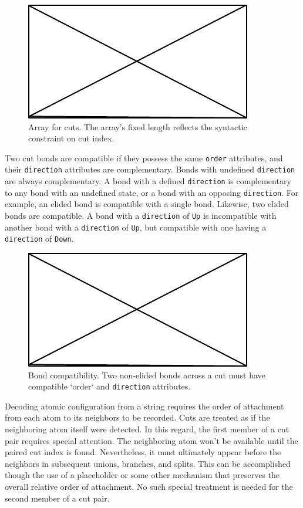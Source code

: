\documentclass{article}
\def\ttt{\texttt}
\begin{document}
\begin{figure}
    \centering
    \includegraphics{filler}
    \caption{Array for cuts. The array's fixed length reflects the syntactic constraint on cut index.}
    \label{fig:cuts-array}
\end{figure}

Two cut bonds are compatible if they possess the same \ttt{order} attributes, and their \ttt{direction} attributes are complementary. Bonds with undefined \ttt{direction} are always complementary. A bond with a defined \ttt{direction} is complementary to any bond with an undefined state, or a bond with an opposing \ttt{direction}. For example, an elided bond is compatible with a single bond. Likewise, two elided bonds are compatible. A bond with a \ttt{direction} of \ttt{Up} is incompatible with another bond with a \ttt{direction} of \ttt{Up}, but compatible with one having a \ttt{direction} of \ttt{Down}.

\begin{figure}
    \centering
    \includegraphics{filler}
    \caption{Bond compatibility. Two non-elided bonds across a cut must have compatible `order` and \ttt{direction} attributes.}
    \label{fig:bond-compatibility}
\end{figure}

Decoding atomic configuration from a string requires the order of attachment from each atom to its neighbors to be recorded. Cuts are treated as if the neighboring atom itself were detected. In this regard, the first member of a cut pair requires special attention. The neighboring atom won't be available until the paired cut index is found. Nevertheless, it must ultimately appear before the neighbors in subsequent unions, branches, and splits. This can be accomplished though the use of a placeholder or some other mechanism that preserves the overall relative order of attachment. No such special treatment is needed for the second member of a cut pair.
\end{document}
